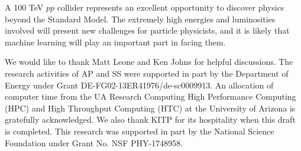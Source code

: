 \documentclass[a4paper,11pt]{article}
\begin{document}
A 100 TeV $pp$ collider represents an excellent opportunity to discover
physics beyond the Standard Model. The extremely high energies and luminosities
involved will present new challenges for particle physicists, and it is likely
that machine learning will play an important part in facing them. 
  
\acknowledgments

We would like to thank Matt Leone and Ken Johns for helpful discussions.  The
research activities of AP and SS were supported in part by the Department of
Energy under Grant DE-FG02-13ER41976/de-sc0009913. An allocation of computer
time from the UA Research Computing High Performance Computing (HPC) and High
Throughput Computing (HTC) at the University of Arizona is gratefully
acknowledged.  We also thank KITP for its hospitality when this draft is completed.  This research was supported in part by the National Science Foundation under Grant No. NSF PHY-1748958.


\end{document}

